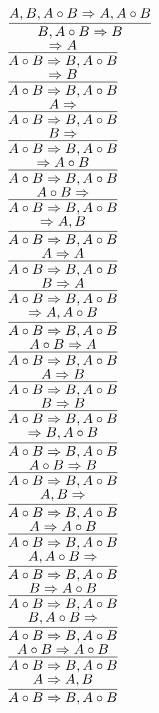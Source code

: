 \documentclass[11pt]{article}
\begin{document}
\begin{center}
\bigskip
\\$\infer{B, A\circ B\Rightarrow B}{A, B, A\circ B\Rightarrow A, A\circ B}$
\bigskip
\\$\infer{A\circ B\Rightarrow B, A\circ B}{\Rightarrow A}$
\bigskip
\\$\infer{A\circ B\Rightarrow B, A\circ B}{\Rightarrow B}$
\bigskip
\\$\infer{A\circ B\Rightarrow B, A\circ B}{A\Rightarrow }$
\bigskip
\\$\infer{A\circ B\Rightarrow B, A\circ B}{B\Rightarrow }$
\bigskip
\\$\infer{A\circ B\Rightarrow B, A\circ B}{\Rightarrow A\circ B}$
\bigskip
\\$\infer{A\circ B\Rightarrow B, A\circ B}{A\circ B\Rightarrow }$
\bigskip
\\$\infer{A\circ B\Rightarrow B, A\circ B}{\Rightarrow A, B}$
\bigskip
\\$\infer{A\circ B\Rightarrow B, A\circ B}{A\Rightarrow A}$
\bigskip
\\$\infer{A\circ B\Rightarrow B, A\circ B}{B\Rightarrow A}$
\bigskip
\\$\infer{A\circ B\Rightarrow B, A\circ B}{\Rightarrow A, A\circ B}$
\bigskip
\\$\infer{A\circ B\Rightarrow B, A\circ B}{A\circ B\Rightarrow A}$
\bigskip
\\$\infer{A\circ B\Rightarrow B, A\circ B}{A\Rightarrow B}$
\bigskip
\\$\infer{A\circ B\Rightarrow B, A\circ B}{B\Rightarrow B}$
\bigskip
\\$\infer{A\circ B\Rightarrow B, A\circ B}{\Rightarrow B, A\circ B}$
\bigskip
\\$\infer{A\circ B\Rightarrow B, A\circ B}{A\circ B\Rightarrow B}$
\bigskip
\\$\infer{A\circ B\Rightarrow B, A\circ B}{A, B\Rightarrow }$
\bigskip
\\$\infer{A\circ B\Rightarrow B, A\circ B}{A\Rightarrow A\circ B}$
\bigskip
\\$\infer{A\circ B\Rightarrow B, A\circ B}{A, A\circ B\Rightarrow }$
\bigskip
\\$\infer{A\circ B\Rightarrow B, A\circ B}{B\Rightarrow A\circ B}$
\bigskip
\\$\infer{A\circ B\Rightarrow B, A\circ B}{B, A\circ B\Rightarrow }$
\bigskip
\\$\infer{A\circ B\Rightarrow B, A\circ B}{A\circ B\Rightarrow A\circ B}$
\bigskip
\\$\infer{A\circ B\Rightarrow B, A\circ B}{A\Rightarrow A, B}$

\end{center}
\end{document}
